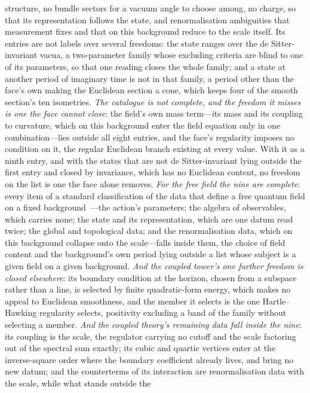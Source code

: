 \documentclass[11pt,a4paper]{article}
\theoremstyle{plain}
\theoremstyle{definition}
\theoremstyle{remark}
\begin{document}
\begin{enumerate}
structure, no bundle sectors for a vacuum angle to choose among, no charge, so that its representation follows the state, and renormalisation ambiguities that measurement fixes and that on this background reduce to the scale itself. Its entries are not labels over several freedoms: the state ranges over the de Sitter-invariant vacua, a two-parameter family whose excluding criteria are blind to one of its parameters, so that one reading closes the whole family; and a state at another period of imaginary time is not in that family, a period other than the face's own making the Euclidean section a cone, which keeps four of the smooth section's ten isometries. \emph{The catalogue is not complete, and the freedom it misses is one the face cannot close}: the field's own mass term---its mass and its coupling to curvature, which on this background enter the field equation only in one combination---lies outside all eight entries, and the face's regularity imposes no condition on it, the regular Euclidean branch existing at every value. With it as a ninth entry, and with the states that are not de Sitter-invariant lying outside the first entry and closed by invariance, which has no Euclidean content, no freedom on the list is one the face alone removes. \emph{For the free field the nine are complete}: every item of a standard classification of the data that define a free quantum field on a fixed background~\cite{Wald1994}---the action's parameters; the algebra of observables, which carries none; the state and its representation, which are one datum read twice; the global and topological data; and the renormalisation data, which on this background collapse onto the scale---falls inside them, the choice of field content and the background's own period lying outside a list whose subject is a given field on a given background. \emph{And the coupled tower's one further freedom is closed elsewhere}: its boundary condition at the horizon, chosen from a subspace rather than a line, is selected by finite quadratic-form energy, which makes no appeal to Euclidean smoothness, and the member it selects is the one Hartle--Hawking regularity selects, positivity excluding a band of the family without selecting a member. \emph{And the coupled theory's remaining data fall inside the nine}: its coupling is the scale, the regulator carrying no cutoff and the scale factoring out of the spectral sum exactly; its cubic and quartic vertices enter at the inverse-square order where the boundary coefficient already lives, and bring no new datum; and the counterterms of its interaction are renormalisation data with the scale, while what stands outside the 
\end{enumerate}
\end{document}
